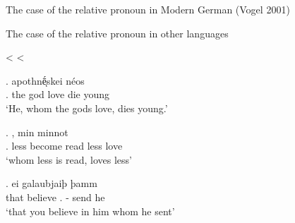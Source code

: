 \documentclass[xcolor=dvipsnames,10pt]{beamer}
\begin{document}
\begin{frame}[t]{The case of the relative pronoun in Modern German (Vogel 2001)}
\vspace{1em}



\end{frame}



\begin{frame}[t]{The case of the relative pronoun in other languages}

\pause

\center
{} <  < 

\pause

\exg.     apothnḗͅskei néos\\
.\textcolor{LimeGreen}{} the god love\textcolor{LimeGreen}{\scsub{[acc]}} die\textcolor{Turquoise}{\scsub{[nom]}} young\\
`He, whom the gods love, dies young.' \label{ex:ag-nom-acc}

\pause

\exg.    , min minnot\\
.\textcolor{red}{} less become read\textcolor{red}{\scsub{[dat]}} less love\textcolor{Turquoise}{\scsub{[nom]}}\\
`whom less is read, loves less' \label{ex:ohg-nom-dat}

\pause

\exg. ei galaubjaiþ þamm   \\
that believe\textcolor{red}{\scsub{[dat]}} .\textcolor{red}{} - {send}\textcolor{LimeGreen}{\scsub{[acc]}} he\\
`that you believe in him whom he sent' \label{ex:gothic-dat-acc}

\end{frame}
\end{document}
